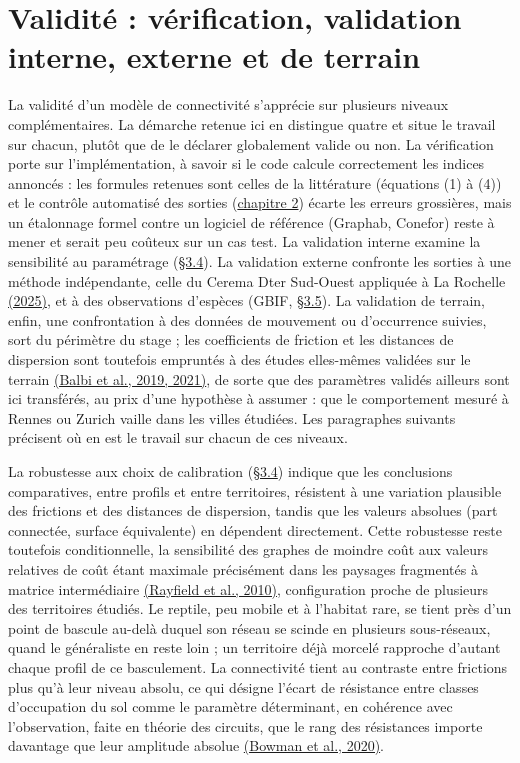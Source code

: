 \documentclass[a4paper,11pt]{report}
\begin{document}
\section{Validité : vérification, validation interne, externe et de terrain}\label{sec:4.4}

La validité d'un modèle de connectivité s'apprécie sur plusieurs niveaux complémentaires. La démarche retenue ici en distingue quatre et situe le travail sur chacun, plutôt que de le déclarer globalement valide ou non. La vérification porte sur l'implémentation, à savoir si le code calcule correctement les indices annoncés : les formules retenues sont celles de la littérature (équations (1) à (4)) et le contrôle automatisé des sorties (\hyperref[chap:2]{chapitre 2}) écarte les erreurs grossières, mais un étalonnage formel contre un logiciel de référence (Graphab, Conefor) reste à mener et serait peu coûteux sur un cas test. La validation interne examine la sensibilité au paramétrage (\hyperref[sec:3.4]{§3.4}). La validation externe confronte les sorties à une méthode indépendante, celle du Cerema Dter Sud-Ouest appliquée à La Rochelle \hyperref[sec:bibliographie]{(2025)}, et à des observations d'espèces (GBIF, \hyperref[sec:3.5]{§3.5}). La validation de terrain, enfin, une confrontation à des données de mouvement ou d'occurrence suivies, sort du périmètre du stage ; les coefficients de friction et les distances de dispersion sont toutefois empruntés à des études elles-mêmes validées sur le terrain \hyperref[sec:bibliographie]{(Balbi et al., 2019, 2021)}, de sorte que des paramètres validés ailleurs sont ici transférés, au prix d'une hypothèse à assumer : que le comportement mesuré à Rennes ou Zurich vaille dans les villes étudiées. Les paragraphes suivants précisent où en est le travail sur chacun de ces niveaux.

La robustesse aux choix de calibration (\hyperref[sec:3.4]{§3.4}) indique que les conclusions comparatives, entre profils et entre territoires, résistent à une variation plausible des frictions et des distances de dispersion, tandis que les valeurs absolues (part connectée, surface équivalente) en dépendent directement. Cette robustesse reste toutefois conditionnelle, la sensibilité des graphes de moindre coût aux valeurs relatives de coût étant maximale précisément dans les paysages fragmentés à matrice intermédiaire \hyperref[sec:bibliographie]{(Rayfield et al., 2010)}, configuration proche de plusieurs des territoires étudiés. Le reptile, peu mobile et à l'habitat rare, se tient près d'un point de bascule au-delà duquel son réseau se scinde en plusieurs sous-réseaux, quand le généraliste en reste loin ; un territoire déjà morcelé rapproche d'autant chaque profil de ce basculement. La connectivité tient au contraste entre frictions plus qu'à leur niveau absolu, ce qui désigne l'écart de résistance entre classes d'occupation du sol comme le paramètre déterminant, en cohérence avec l'observation, faite en théorie des circuits, que le rang des résistances importe davantage que leur amplitude absolue \hyperref[sec:bibliographie]{(Bowman et al., 2020)}.
\end{document}
